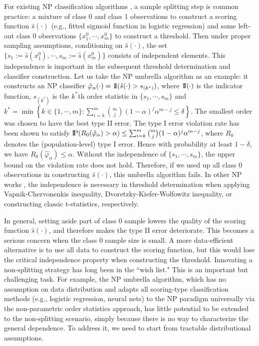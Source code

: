 \documentclass[12pt]{article}
\numberwithin{equation}{section}
\theoremstyle{remark}
\newcommand{\p}{{\rm I}\kern-0.18em{\rm P}}
\newcommand{\1}{{\rm 1}\kern-0.24em{\rm I}}
\begin{document}
 For existing NP classification algorithms \citep{tong2013plug, zhao2016neyman, tong2018neyman, Tong.Xia.Wang.Feng.2020}, a sample splitting step is common practice: a mixture of class 0 and class 1 observations to construct a scoring function $\hat s(\cdot)$ (e.g., fitted sigmoid function in logistic regression) and some left-out class 0 observations $\{x^0_1, \cdots, x^0_m\}$ to construct a threshold. Then under proper sampling assumptions, conditioning on $\hat s(\cdot)$, the set $\{s_1:= \hat s(x^0_1), \cdots, s_m:=\hat s (x^0_m)\}$ consists of independent elements. This independence is important in the subsequent threshold determination and classifier construction. Let us take the NP umbrella algorithm \citep{tong2018neyman} as an example: it constructs an NP classifier $\hat\varphi_{\alpha}(\cdot)=\1(\hat s(\cdot)> s_{(k^*)})$, where $\1(\cdot)$ is the indicator function,  $s_{(k^*)}$ is the $k^*$th order statistic in $\{s_1, \cdots, s_m\}$ and $k^*=\min\left\{k\in\{1, \cdots, m\}: \sum_{i=k}^m {m\choose j} (1-\alpha)^j \alpha^{m-j}\leq \delta\right\}$. The smallest order was chosen to have the best type II error.  
 The type I error violation rate has been shown to satisfy $\p(R_0(\hat \varphi_{\alpha})> \alpha)\leq \sum_{i=k}^m {m\choose j} (1-\alpha)^j \alpha^{m-j}$, where $R_0$ denotes the (population-level) type I error. Hence with probability at least $1-\delta$, we have $R_0(\hat \varphi_{\alpha})\leq  \alpha$. Without the independence of  $\{s_1, \cdots, s_m\}$, the upper bound on the violation rate does not hold.  Therefore, if we used up all class 0 observations in constructing $\hat s(\cdot)$, this umbrella algorithm fails.  In other NP works \citep{tong2013plug, zhao2016neyman, Tong.Xia.Wang.Feng.2020}, the independence is necessary in threshold determination when applying Vapnik-Chervonenkis inequality, Dvoretzky-Kiefer-Wolfowitz inequality, or constructing classic t-statistics, respectively.  
 
 In general, setting aside part of class 0 sample lowers the quality of the scoring function $\hat s(\cdot)$, and therefore makes  the type II error deteriorate.  This becomes a serious concern when the class 0 sample size is small. A more data-efficient alternative is to use all data to construct the scoring function, but this would lose the critical independence property when constructing the threshold.  Innovating a non-splitting strategy has long been in the ``wish list." This is an important but challenging task. For example, the NP umbrella algorithm, which has no assumption on data distribution and adapts all scoring-type classification methods (e.g., logistic regression, neural nets) to the NP paradigm universally via the non-parametric order statistics approach, has little potential to be extended to the non-splitting scenario, simply because there is no way to characterize the general dependence. To address it, we need to start from tractable distributional assumptions. 
 
\end{document}
